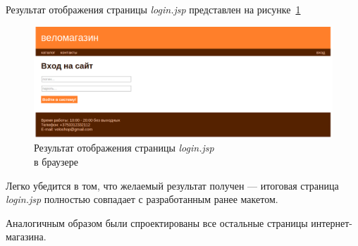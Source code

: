 Результат отображения страницы \textit{login.jsp} представлен на рисунке~\ref{fig:login_jsp}

\begin{figure}[h]
  \centering
  \includegraphics[width=160mm]{pic/login_site.png}
  \caption{Результат отображения страницы \textit{login.jsp} \\ в браузере}
  \label{fig:login_jsp}
\end{figure}

Легко убедится в том, что желаемый результат получен --- итоговая страница \textit{login.jsp}
полностью совпадает с разработанным ранее макетом.

Аналогичным образом были спроектированы все остальные страницы интернет-магазина.

\pagebreak
